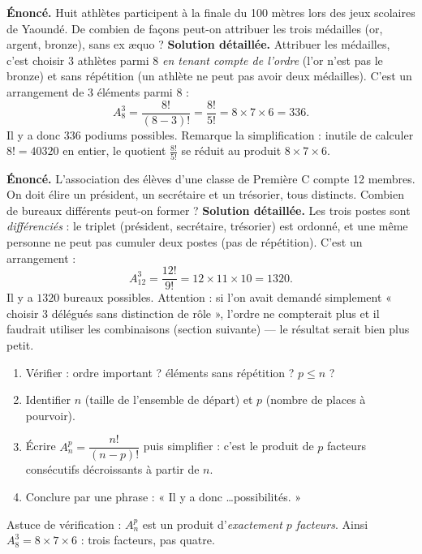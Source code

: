\documentclass[11pt]{article}
\begin{document}
\begin{exoresolu}
\textbf{Énoncé.} Huit athlètes participent à la finale du 100 mètres lors des jeux scolaires de Yaoundé. De combien de façons peut-on attribuer les trois médailles (or, argent, bronze), sans ex æquo ?
\tcblower
\textbf{Solution détaillée.} Attribuer les médailles, c'est choisir 3 athlètes parmi 8 \emph{en tenant compte de l'ordre} (l'or n'est pas le bronze) et sans répétition (un athlète ne peut pas avoir deux médailles). C'est un arrangement de 3 éléments parmi 8 :
\[ A_8^3 = \frac{8!}{(8-3)!} = \frac{8!}{5!} = 8\times 7\times 6 = 336. \]
Il y a donc $\boxed{336}$ podiums possibles. Remarque la simplification : inutile de calculer $8! = \num{40320}$ en entier, le quotient $\frac{8!}{5!}$ se réduit au produit $8\times 7\times 6$.
\end{exoresolu}

\begin{exoresolu}
\textbf{Énoncé.} L'association des élèves d'une classe de Première C compte 12 membres. On doit élire un président, un secrétaire et un trésorier, tous distincts. Combien de bureaux différents peut-on former ?
\tcblower
\textbf{Solution détaillée.} Les trois postes sont \emph{différenciés} : le triplet (président, secrétaire, trésorier) est ordonné, et une même personne ne peut pas cumuler deux postes (pas de répétition). C'est un arrangement :
\[ A_{12}^3 = \frac{12!}{9!} = 12\times 11\times 10 = \num{1320}. \]
Il y a $\num{1320}$ bureaux possibles. Attention : si l'on avait demandé simplement « choisir 3 délégués sans distinction de rôle », l'ordre ne compterait plus et il faudrait utiliser les combinaisons (section suivante) — le résultat serait bien plus petit.
\end{exoresolu}

\begin{methode}
\begin{enumerate}
\item Vérifier : ordre important ? éléments sans répétition ? $p \leq n$ ?
\item Identifier $n$ (taille de l'ensemble de départ) et $p$ (nombre de places à pourvoir).
\item Écrire $A_n^p = \dfrac{n!}{(n-p)!}$ puis simplifier : c'est le produit de $p$ facteurs consécutifs décroissants à partir de $n$.
\item Conclure par une phrase : « Il y a donc \ldots possibilités. »
\end{enumerate}
Astuce de vérification : $A_n^p$ est un produit d'\emph{exactement $p$ facteurs}. Ainsi $A_8^3 = 8\times 7\times 6$ : trois facteurs, pas quatre.
\end{methode}
\end{document}
